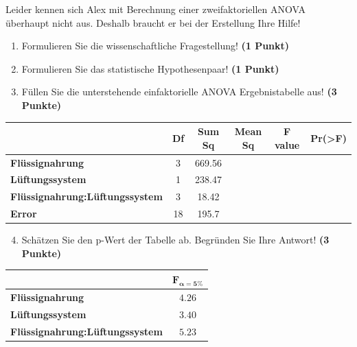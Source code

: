 \documentclass[a4paper, 9pt]{scrartcl}\usepackage[]{graphicx}\usepackage[]{xcolor}
\begin{document}
\vspace{1ex}

Leider kennen sich Alex mit Berechnung einer zweifaktoriellen ANOVA überhaupt nicht aus. Deshalb braucht er bei der Erstellung Ihre Hilfe! 

\begin{enumerate}
  \item Formulieren Sie die wissenschaftliche Fragestellung! \textbf{(1 Punkt)}
  \item Formulieren Sie das statistische Hypothesenpaar! \textbf{(1 Punkt)}
\item Füllen Sie die unterstehende einfaktorielle ANOVA Ergebnistabelle aus! \textbf{(3 Punkte)}
\end{enumerate}

\vspace{1Ex}

\begin{center}
  \Large
  \begin{tabular}{lccccc}
  \toprule
     & \textbf{Df} & \textbf{Sum Sq} & \textbf{Mean Sq} & \textbf{F value} & \textbf{Pr(>F)} \strut\\
    \midrule
   \textbf{Flüssignahrung}  & 3 & 669.56 &  &  &  \strut\\
    \textbf{Lüftungssystem}  & 1 & 238.47 &  &  &  \strut\\
    \textbf{Flüssignahrung:Lüftungssystem}  & 3 & 18.42 &  &  &  \strut\\
   \textbf{Error}  & 18 & 195.7 &  &  &  \strut\\
\bottomrule
  \end{tabular}
\end{center}

\vspace{1Ex}

\begin{enumerate}
  \setcounter{enumi}{3}
\item Schätzen Sie den p-Wert der Tabelle ab. Begründen Sie Ihre
  Antwort! \textbf{(3 Punkte)}
\end{enumerate}
  
\begin{center}
    \Large
\begin{tabular}{lc}
  \toprule
     & $\boldsymbol{F_{\alpha = 5\%}}$ \\
\midrule
  \textbf{Flüssignahrung} & $4.26$ \\
  \textbf{Lüftungssystem} & $3.40$ \\
  \textbf{Flüssignahrung:Lüftungssystem} & $5.23$ \\
  \bottomrule
  \end{tabular}
\end{center}
\end{document}
